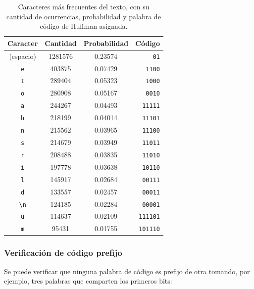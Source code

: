 \begin{table}[htpb]
    \centering
    \begin{tabular}{c S[table-format=7.0] S[table-format=1.5] r}
        \toprule
        Caracter & {Cantidad} & {Probabilidad} & Código \\
        \midrule
        (espacio)                      & 1281576 & 0.23574 & \texttt{01}     \\
        \texttt{e}                     & 403875  & 0.07429 & \texttt{1100}   \\
        \texttt{t}                     & 289404  & 0.05323 & \texttt{1000}   \\
        \texttt{o}                     & 280908  & 0.05167 & \texttt{0010}   \\
        \texttt{a}                     & 244267  & 0.04493 & \texttt{11111}  \\
        \texttt{h}                     & 218199  & 0.04014 & \texttt{11101}  \\
        \texttt{n}                     & 215562  & 0.03965 & \texttt{11100}  \\
        \texttt{s}                     & 214679  & 0.03949 & \texttt{11011}  \\
        \texttt{r}                     & 208488  & 0.03835 & \texttt{11010}  \\
        \texttt{i}                     & 197778  & 0.03638 & \texttt{10110}  \\
        \texttt{l}                     & 145917  & 0.02684 & \texttt{00111}  \\
        \texttt{d}                     & 133557  & 0.02457 & \texttt{00011}  \\
        \verb|\n|                      & 124185  & 0.02284 & \texttt{00001}  \\
        \texttt{u}                     & 114637  & 0.02109 & \texttt{111101} \\
        \texttt{m}                     & 95431   & 0.01755 & \texttt{101110} \\
        \bottomrule
    \end{tabular}
    \caption{Caracteres más frecuentes del texto, con su cantidad de ocurrencias, probabilidad y palabra de código de Huffman asignada.}
    \label{tab:caracteres-frecuentes}
\end{table}

\subsubsection{Verificación de código prefijo}
\label{sec:verificacion-prefijo}
Se puede verificar que ninguna palabra de código es prefijo de otra tomando, por ejemplo, tres palabras que comparten los primeros bits:

